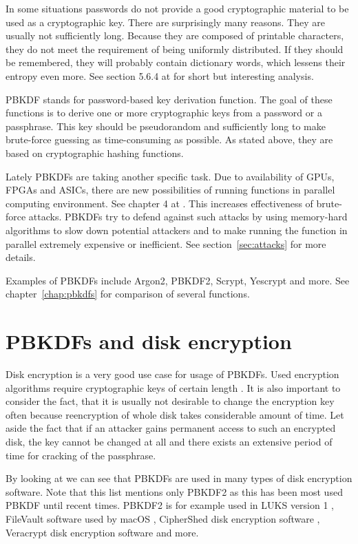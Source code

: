 \documentclass[nolof,digital]{fithesis3}
\begin{document}
In some situations passwords  do not provide a good cryptographic material to be used as a cryptographic key. There are surprisingly many reasons. They are usually not sufficiently long. Because they are composed of printable characters, they do not meet the requirement of being uniformly distributed. If they should be remembered, they will probably contain dictionary words, which lessens their entropy even more. See section 5.6.4 at \parencite{itmc14} for short but interesting analysis.

PBKDF stands for password-based key derivation function. The goal of these functions is to derive one or more cryptographic keys from a password or a passphrase. This key should be pseudorandom and sufficiently long to make brute-force guessing as time-consuming as possible. As stated above, they are based on cryptographic hashing functions.

Lately PBKDFs are taking another specific task. Due to availability of GPUs, FPGAs and ASICs, there are new possibilities of running functions in parallel computing environment. See chapter 4 at \parencite{mosnacek}. This increases effectiveness of brute-force attacks. PBKDFs try to defend against such attacks by using memory-hard algorithms to slow down potential attackers and to make running the function in parallel extremely expensive or inefficient. See section~\ref{sec:attacks} for more details.

Examples of PBKDFs include Argon2, PBKDF2, Scrypt, Yescrypt and more. See chapter~\ref{chap:pbkdfs} for comparison of several functions.

\section{PBKDFs and disk encryption}
Disk encryption is a very good use case for usage of PBKDFs. Used encryption algorithms require cryptographic keys of certain length \parencite{veracrypt}. It is also important to consider the fact, that it is usually not desirable to change the encryption key often because reencryption of whole disk takes considerable amount of time. Let aside the fact that if an attacker gains permanent access to such an encrypted disk, the key cannot be changed at all and there exists an extensive period of time for cracking of the passphrase.

By looking at \parencite{pbkdf2usage} we can see that PBKDFs are used in many types of disk encryption software. Note that this list mentions only PBKDF2 as this has been most used PBKDF until recent times. PBKDF2 is for example used in LUKS version 1 \parencite{luks1}, FileVault software used by macOS \parencite{filevault}, CipherShed disk encryption software \parencite{ciphershed}, Veracrypt disk encryption software \parencite{veracrypt} and more.
\end{document}
